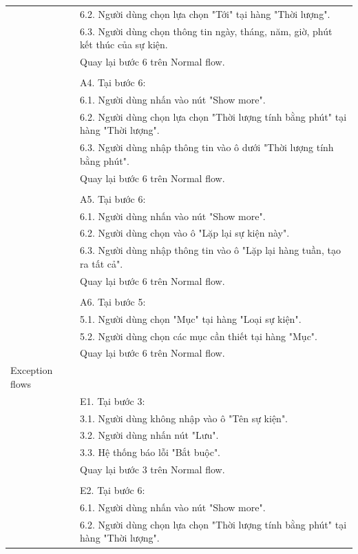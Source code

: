 \documentclass[a4paper, 12pt]{article}
\begin{document}
\begin{table}[H]
\begin{tabular}{|l|p{11cm}|}
        & 6.2. Người dùng chọn lựa chọn "Tới" tại hàng "Thời lượng". \\
        & 6.3. Người dùng chọn thông tin ngày, tháng, năm, giờ, phút kết thúc của sự kiện. \\
        & Quay lại bước 6 trên Normal flow. \\
        & \\
        & A4. Tại bước 6: \\
        & 6.1. Người dùng nhấn vào nút "Show more". \\
        & 6.2. Người dùng chọn lựa chọn "Thời lượng tính bằng phút" tại hàng "Thời lượng". \\
        & 6.3. Người dùng nhập thông tin vào ô dưới "Thời lượng tính bằng phút". \\
        & Quay lại bước 6 trên Normal flow. \\
        & \\
        & A5. Tại bước 6: \\
        & 6.1. Người dùng nhấn vào nút "Show more". \\
        & 6.2. Người dùng chọn vào ô "Lặp lại sự kiện này". \\
        & 6.3. Người dùng nhập thông tin vào ô "Lặp lại hàng tuần, tạo ra tất cả". \\
        & Quay lại bước 6 trên Normal flow. \\
        & \\
        & A6. Tại bước 5: \\
        & 5.1. Người dùng chọn "Mục" tại hàng "Loại sự kiện". \\
        & 5.2. Người dùng chọn các mục cần thiết tại hàng "Mục". \\
        & Quay lại bước 6 trên Normal flow. \\
        \hline
        Exception flows & \\
        & E1. Tại bước 3: \\
        & 3.1. Người dùng không nhập vào ô "Tên sự kiện". \\
        & 3.2. Người dùng nhấn nút "Lưu". \\
        & 3.3. Hệ thống báo lỗi "Bắt buộc". \\
        & Quay lại bước 3 trên Normal flow. \\
        & \\
        & E2. Tại bước 6: \\
        & 6.1. Người dùng nhấn vào nút "Show more". \\
        & 6.2. Người dùng chọn lựa chọn "Thời lượng tính bằng phút" tại hàng "Thời lượng". \\

\end{tabular}
\end{table}
\end{document}
